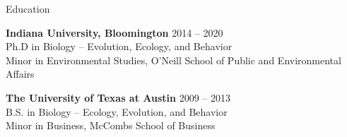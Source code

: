\documentclass{resume} %
\begin{document}

\begin{rSection}{Education}

{\bf Indiana University, Bloomington} \hfill {2014 -- 2020} \\
Ph.D in Biology -- Evolution, Ecology, and Behavior \\
Minor in Environmental Studies, O'Neill School of Public and Environmental Affairs

{\bf The University of Texas at Austin} \hfill {2009 -- 2013} \\
B.S. in Biology -- Ecology, Evolution, and Behavior \\
Minor in Business, McCombs School of Business

\end{rSection}
\bigskip

\end{document}
